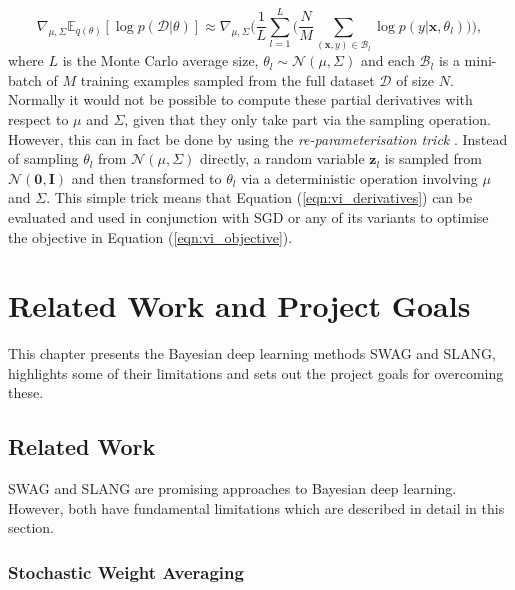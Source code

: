 \documentclass[msc,deptreport.inf]{infthesis} %
\newcommand{\matr}[1]{\mathbf{#1}}
\newcommand{\E}{\mathbb E}
\begin{document}
\begin{equation}\label{eqn:vi_derivatives}
	 \nabla_{\mu, \Sigma} \E_{q(\theta)} [\log p(\mathcal{D} | \theta)]
	\approx \nabla_{\mu, \Sigma} \Bigg(\frac{1}{L}  \sum_{l=1}^{L} \Bigg( \frac{N}{M} \sum_{(\matr{x}, y) \in \mathcal{B}_l} \log p(y | \matr{x}, \theta_l) \Bigg)\Bigg),
\end{equation}
where $L$ is the Monte Carlo average size, $\theta_l \sim \mathcal{N}(\mu, \Sigma)$ and each $\mathcal{B}_l$ is a mini-batch of $M$ training examples sampled from the full dataset $\mathcal{D}$ of size $N$. Normally it would not be possible to compute these partial derivatives with respect to $\mu$ and $\Sigma$, given that they only take part via the sampling operation. However, this can in fact be done by using the \emph{re-parameterisation trick} \cite{goodfellow2016}. Instead of sampling $\theta_l$ from $\mathcal{N}(\mu, \Sigma)$ directly, a random variable $\matr{z}_l$ is sampled from $\mathcal{N}(\matr{0}, \matr{I})$ and then transformed to $\theta_l$ via a deterministic operation involving $\mu$ and $\Sigma$. This simple trick means that Equation (\ref{eqn:vi_derivatives}) can be evaluated and used in conjunction with SGD or any of its variants to optimise the objective in Equation (\ref{eqn:vi_objective}).


\chapter{Related Work and Project Goals}\label{ch:previous_work}

This chapter presents the Bayesian deep learning methods SWAG and SLANG, highlights some of their limitations and sets out the project goals for overcoming these. 

\section{Related Work}\label{sec:related_work}

SWAG and SLANG are promising approaches to Bayesian deep learning. However, both have fundamental limitations which are described in detail in this section.

\subsection{Stochastic Weight Averaging}\label{sec:swa}
\end{document}
